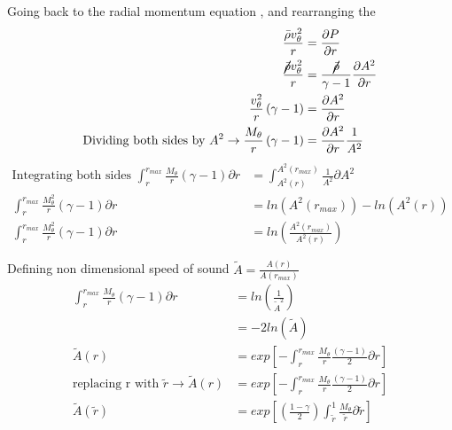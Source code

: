 Going back to the radial momentum equation , and rearranging the 
\begin{align*}
\frac{\bar{\rho} v_{\theta}^2}{r} 
&=\frac{\partial P}{\partial r}\\
\frac{\cancel{\bar{\rho}} v_{\theta}^2}{r} 
&=\frac{\cancel{\bar{\rho}}}{\gamma -1}\frac{\partial A^2}{\partial r}\\
\frac{v_{\theta}^2}{r}\left(\gamma -1\right) &= \frac{\partial A^2}{\partial r}\\ \text{Dividing both sides by } A^2 \rightarrow \frac{M_{\theta}}{r}\left(\gamma - 1\right) &= \frac{\partial A^2}{\partial r} \frac{1}{A^2}
\end{align*}
\begin{align*}
\text{Integrating both sides } \int_{r}^{r_{max}}\frac{M_{\theta}}{r}\left(\gamma - 1\right){\partial r}  &=\int_{A^2(r)}^{A^2(r_{max})}\frac{1}{A^2}  {\partial A^2}\\
\int_{r}^{r_{max}}\frac{M^2_{\theta}}{r}\left(\gamma - 1\right){\partial r}  &=ln(A^2(r_{max})) - ln(A^2(r)) \\
\int_{r}^{r_{max}}\frac{M^2_{\theta}}{r}\left(\gamma - 1\right){\partial r}  &=ln\left(\frac{A^2(r_{max})}{A^2(r)}\right) 
\end{align*}

Defining non dimensional speed of sound $\tilde{A} = \frac{A(r)}{A(r_{max})}$
\begin{align*}
\int_{r}^{r_{max}}\frac{M_{\theta}}{r}\left(\gamma - 1\right){\partial r}  &=ln\left(\frac{1}{\tilde{A}^2}\right) \\
&= -2ln(\tilde{A})\\
\tilde{A}(r) &= exp\left[-\int_{r}^{r_{max}}\frac{M_{\theta}}{r}\frac{\left(\gamma - 1\right)}{2}{\partial r}\right] \\ \text{replacing r with }\tilde{r} \rightarrow \tilde{A}(r) &= exp\left[-\int_{r}^{r_{max}}\frac{M_{\theta}}{r}\frac{\left(\gamma - 1\right)}{2}{\partial r}\right]		\\
\tilde{A}(\tilde{r}) &= exp\left[\left(\frac{1 - \gamma}{2}\right)\int_{\tilde{r}}^{1}\frac{M_{\theta}}{\tilde{r}}{\partial \tilde{r}}\right]	
\end{align*}

